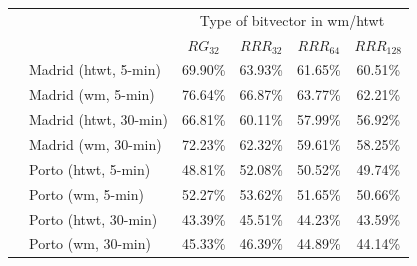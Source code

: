 	\begin{table}[ht]
	\begin{center}
	  \begin{tabular}{|c|l|*{4}{c}|}
	  \cline{3-6}
	  \multicolumn{2}{c|}{} & \multicolumn{4}{c|}{Type of bitvector in \gls{wm}/\gls{htwt}} \\

	  \multicolumn{2}{c|}{}     &$RG_{32}$& $RRR_{32}$& $RRR_{64}$&$RRR_{128}$ \\
	  \hline
	  \multirow{8}{*}{\STAB{\rotatebox[origin=c]{90}{$t_{\Psi}=32$}}}
	   & Madrid (\gls{htwt}, 5-min)  & 69.90\% &   63.93\% &   61.65\% &   60.51\% \\
	   & Madrid (\gls{wm}, 5-min)     & 76.64\% &   66.87\% &   63.77\% &   62.21\% \\
	   & Madrid (\gls{htwt}, 30-min) & 66.81\% &   60.11\% &   57.99\% &   56.92\% \\
	   & Madrid (\gls{wm}, 30-min)    & 72.23\% &   62.32\% &   59.61\% &   58.25\% \\
	  \cline{2-6}
	   & Porto (\gls{htwt}, 5-min)   & 48.81\% &   52.08\% &   50.52\% &   49.74\% \\
	   & Porto (\gls{wm}, 5-min)      & 52.27\% &   53.62\% &   51.65\% &   50.66\% \\
	   & Porto (\gls{htwt}, 30-min)  & 43.39\% &   45.51\% &   44.23\% &   43.59\% \\
	   & Porto (\gls{wm}, 30-min)     & 45.33\% &   46.39\% &   44.89\% &   44.14\% \\
	  \hline
	  


\end{tabular}
\end{center}
\end{table}
